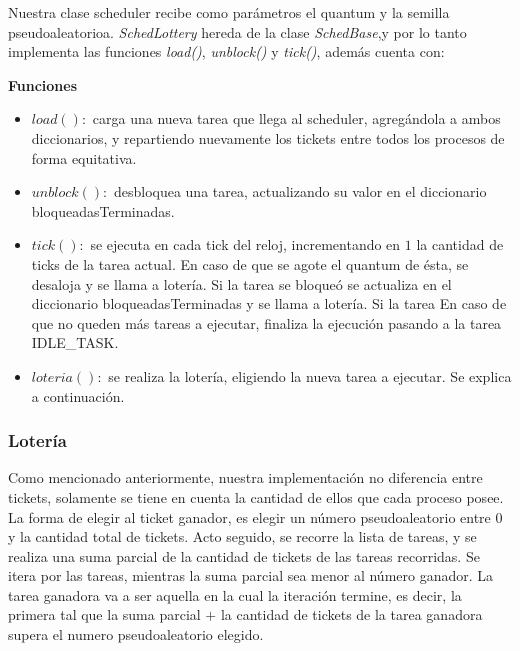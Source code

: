 \vspace{2mm}

Nuestra clase scheduler recibe como par\'ametros el quantum y la semilla pseudoaleatorioa. \textit{SchedLottery} hereda de la clase \textit{SchedBase},y por lo tanto implementa las funciones \textit{load()}, \textit{unblock()} y \textit{tick()}, adem\'as cuenta con:


\vspace{2mm}

\textbf{Funciones}

\begin{itemize}

\item $load():$ carga una nueva tarea que llega al scheduler, agreg\'andola a ambos diccionarios, y repartiendo nuevamente los tickets entre todos los procesos de forma equitativa.

\item $unblock(): $ desbloquea una tarea, actualizando su valor en el diccionario bloqueadasTerminadas.

\item $tick(): $ se ejecuta en cada tick del reloj, incrementando en $1$ la cantidad de ticks de la tarea actual. En caso de que se agote el quantum de \'esta, se desaloja y se llama a loter\'ia. Si la tarea se bloque\'o se actualiza en el diccionario bloqueadasTerminadas y se llama a loter\'ia. Si la tarea En caso de que no queden m\'as tareas a ejecutar, finaliza la ejecuci\'on pasando a la tarea IDLE\_TASK.
\item $loteria(): $ se realiza la loter\'ia, eligiendo la nueva tarea a ejecutar. Se explica a continuaci\'on.

\end{itemize}

\subsubsection{Loter\'ia}

Como mencionado anteriormente, nuestra implementaci\'on no diferencia entre tickets, solamente se tiene en cuenta la cantidad de ellos que cada proceso posee. La forma de elegir al ticket ganador, es elegir un n\'umero pseudoaleatorio entre 0 y la cantidad total de tickets. Acto seguido, se recorre la lista de tareas, y se realiza una suma parcial de la cantidad de tickets de las tareas recorridas. Se itera por las tareas, mientras la suma parcial sea menor al n\'umero ganador. La tarea ganadora va a ser aquella en la cual la iteraci\'on termine, es decir, la primera tal que la suma parcial $+$ la cantidad de tickets de la tarea ganadora supera el numero pseudoaleatorio elegido.

